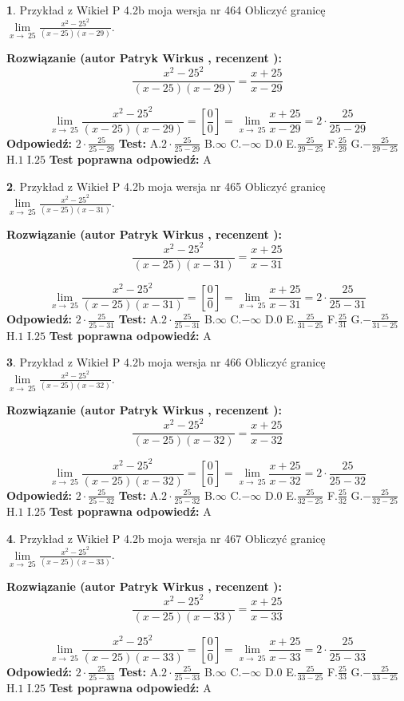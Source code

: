 \documentclass[12pt, a4paper]{article}
\theoremstyle{definition} %
\newtheorem{zad}{}
\newcommand{\zadStart}[1]{\begin{zad}#1\newline}
\newcommand{\zadStop}{\end{zad}}
\newcommand{\rozwStart}[2]{\noindent \textbf{Rozwiązanie (autor #1 , recenzent #2): }\newline}
\newcommand{\rozwStop}{\newline}
\newcommand{\odpStart}{\noindent \textbf{Odpowiedź:}\newline}
\newcommand{\odpStop}{\newline}
\newcommand{\testStart}{\noindent \textbf{Test:}\newline}
\newcommand{\testStop}{\newline}
\newcommand{\kluczStart}{\noindent \textbf{Test poprawna odpowiedź:}\newline}
\newcommand{\kluczStop}{\newline}
\begin{document}
\zadStart{Przykład z Wikieł P 4.2b moja wersja nr 464}
Obliczyć granicę $\lim\limits_{x\to\ 25}\frac{x^{2}-25^{2}}{(x-25)(x-29)}$.
\zadStop
\rozwStart{Patryk Wirkus}{}
$$\frac{x^{2}-25^{2}}{(x-25)(x-29)}=\frac{x+25}{x-29}$$

$$\lim\limits_{x\to\ 25}\frac{x^{2}-25^{2}}{(x-25)(x-29)}=[\frac{0}{0}]=\lim\limits_{x\to\ 25}\frac{x+25}{x-29}=2 \cdot \frac{25}{25-29}$$
\rozwStop
\odpStart
$2 \cdot \frac{25}{25-29}$
\odpStop
\testStart
A.$2 \cdot \frac{25}{25-29}$
B.$\infty$
C.$-\infty$
D.$0$
E.$\frac{25}{29-25}$
F.$\frac{25}{29}$
G.$-\frac{25}{29-25}$
H.$1$
I.$25$
\testStop
\kluczStart
A
\kluczStop



\zadStart{Przykład z Wikieł P 4.2b moja wersja nr 465}
Obliczyć granicę $\lim\limits_{x\to\ 25}\frac{x^{2}-25^{2}}{(x-25)(x-31)}$.
\zadStop
\rozwStart{Patryk Wirkus}{}
$$\frac{x^{2}-25^{2}}{(x-25)(x-31)}=\frac{x+25}{x-31}$$

$$\lim\limits_{x\to\ 25}\frac{x^{2}-25^{2}}{(x-25)(x-31)}=[\frac{0}{0}]=\lim\limits_{x\to\ 25}\frac{x+25}{x-31}=2 \cdot \frac{25}{25-31}$$
\rozwStop
\odpStart
$2 \cdot \frac{25}{25-31}$
\odpStop
\testStart
A.$2 \cdot \frac{25}{25-31}$
B.$\infty$
C.$-\infty$
D.$0$
E.$\frac{25}{31-25}$
F.$\frac{25}{31}$
G.$-\frac{25}{31-25}$
H.$1$
I.$25$
\testStop
\kluczStart
A
\kluczStop



\zadStart{Przykład z Wikieł P 4.2b moja wersja nr 466}
Obliczyć granicę $\lim\limits_{x\to\ 25}\frac{x^{2}-25^{2}}{(x-25)(x-32)}$.
\zadStop
\rozwStart{Patryk Wirkus}{}
$$\frac{x^{2}-25^{2}}{(x-25)(x-32)}=\frac{x+25}{x-32}$$

$$\lim\limits_{x\to\ 25}\frac{x^{2}-25^{2}}{(x-25)(x-32)}=[\frac{0}{0}]=\lim\limits_{x\to\ 25}\frac{x+25}{x-32}=2 \cdot \frac{25}{25-32}$$
\rozwStop
\odpStart
$2 \cdot \frac{25}{25-32}$
\odpStop
\testStart
A.$2 \cdot \frac{25}{25-32}$
B.$\infty$
C.$-\infty$
D.$0$
E.$\frac{25}{32-25}$
F.$\frac{25}{32}$
G.$-\frac{25}{32-25}$
H.$1$
I.$25$
\testStop
\kluczStart
A
\kluczStop



\zadStart{Przykład z Wikieł P 4.2b moja wersja nr 467}
Obliczyć granicę $\lim\limits_{x\to\ 25}\frac{x^{2}-25^{2}}{(x-25)(x-33)}$.
\zadStop
\rozwStart{Patryk Wirkus}{}
$$\frac{x^{2}-25^{2}}{(x-25)(x-33)}=\frac{x+25}{x-33}$$

$$\lim\limits_{x\to\ 25}\frac{x^{2}-25^{2}}{(x-25)(x-33)}=[\frac{0}{0}]=\lim\limits_{x\to\ 25}\frac{x+25}{x-33}=2 \cdot \frac{25}{25-33}$$
\rozwStop
\odpStart
$2 \cdot \frac{25}{25-33}$
\odpStop
\testStart
A.$2 \cdot \frac{25}{25-33}$
B.$\infty$
C.$-\infty$
D.$0$
E.$\frac{25}{33-25}$
F.$\frac{25}{33}$
G.$-\frac{25}{33-25}$
H.$1$
I.$25$
\testStop
\kluczStart
A
\kluczStop
\end{document}
